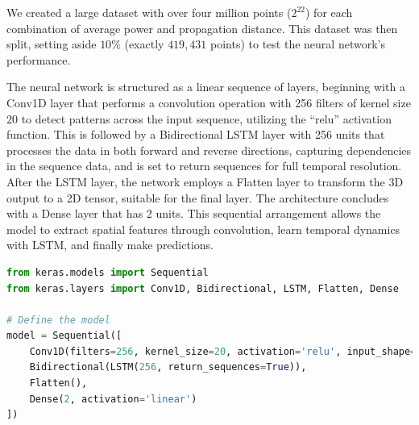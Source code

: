 
We created a large dataset with over four million points ($2^{22}$) for each combination of average power and propagation distance. This dataset was then split, setting aside $10\%$ (exactly $419,431$ points) to test the neural network's performance.


The neural network is structured as a linear sequence of layers, beginning with a Conv1D layer that performs a convolution operation with 256 filters of kernel size 20 to detect patterns across the input sequence, utilizing the ``relu'' activation function. This is followed by a Bidirectional LSTM layer with 256 units that processes the data in both forward and reverse directions, capturing dependencies in the sequence data, and is set to return sequences for full temporal resolution. After the LSTM layer, the network employs a Flatten layer to transform the 3D output to a 2D tensor, suitable for the final layer. The architecture concludes with a Dense layer that has 2 units. This sequential arrangement allows the model to extract spatial features through convolution, learn temporal dynamics with LSTM, and finally make predictions.



\begin{lstlisting}[language=Python, caption=Default WDM parameters, label=lst:nn_keras]
from keras.models import Sequential
from keras.layers import Conv1D, Bidirectional, LSTM, Flatten, Dense

# Define the model
model = Sequential([
    Conv1D(filters=256, kernel_size=20, activation='relu', input_shape=(42, 1)),
    Bidirectional(LSTM(256, return_sequences=True)),
    Flatten(),
    Dense(2, activation='linear')
])
\end{lstlisting}


